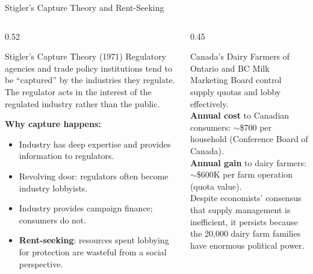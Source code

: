 \documentclass[aspectratio=169]{beamer}
\begin{document}
\begin{frame}{Stigler's Capture Theory and Rent-Seeking}
\begin{columns}
\begin{column}{0.52\textwidth}
\begin{block}{Stigler's Capture Theory (1971)}
  Regulatory agencies and trade policy institutions tend to be ``captured'' by the industries they regulate. The regulator acts in the interest of the regulated industry rather than the public.
\end{block}
\vspace{0.3em}
\textbf{Why capture happens:}
\begin{itemize}
  \item Industry has deep expertise and provides information to regulators.
  \item Revolving door: regulators often become industry lobbyists.
  \item Industry provides campaign finance; consumers do not.
  \item \textbf{Rent-seeking}: resources spent lobbying for protection are wasteful from a social perspective.
\end{itemize}
\end{column}
\begin{column}{0.45\textwidth}
\begin{canadex}
  Canada's Dairy Farmers of Ontario and BC Milk Marketing Board control supply quotas and lobby effectively.\\[0.3em]
  \textbf{Annual cost} to Canadian consumers: $\sim$\$700 per household (Conference Board of Canada).\\[0.3em]
  \textbf{Annual gain} to dairy farmers: $\sim$\$600K per farm operation (quota value).\\[0.3em]
  Despite economists' consensus that supply management is inefficient, it persists because the 20,000 dairy farm families have enormous political power.
\end{canadex}
\end{column}
\end{columns}
\end{frame}
\end{document}
